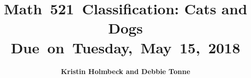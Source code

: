 


\newcommand{\hmwkTitle}{Classification: Cats and Dogs} %
\newcommand{\hmwkDueDate}{Tuesday,\ May\ 15,\ 2018} %
\newcommand{\hmwkClass}{Math\ 521} %
\newcommand{\hmwkAuthorName}{Kristin Holmbeck and Debbie Tonne} %


\title{
\textmd{\textbf{\hmwkClass \ \hmwkTitle}}\\
\normalsize\vspace{0.1in}\small{Due\ on\ \hmwkDueDate}\\
\vspace{0.1in}
\vspace{0.2in}
}

\author{\textbf{\hmwkAuthorName}}
\date{} %




\maketitle


\vspace{0.75in}
\tableofcontents
\listoffigures

\newpage



